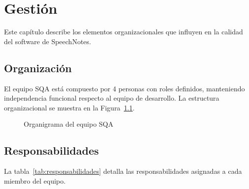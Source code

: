 \chapter{Gestión}
\label{sec:gestion}

Este capítulo describe los elementos organizacionales que influyen en la calidad del software de SpeechNotes.

\section{Organización}
\label{sec:organizacion}

El equipo SQA está compuesto por 4 personas con roles definidos, manteniendo independencia funcional respecto al equipo de desarrollo. La estructura organizacional se muestra en la Figura~\ref{fig:organigrama}.

\begin{figure}[H]
\centering
{}
\caption{Organigrama del equipo SQA}
\label{fig:organigrama}
\end{figure}

\section{Responsabilidades}
\label{sec:responsabilidades}

La tabla~\ref{tab:responsabilidades} detalla las responsabilidades asignadas a cada miembro del equipo.

